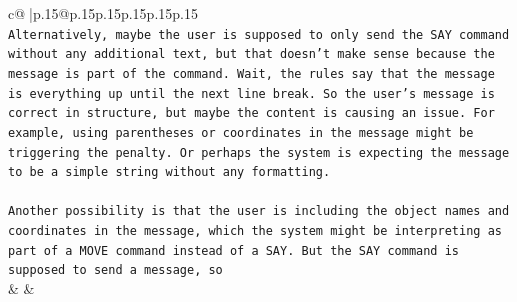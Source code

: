 \documentclass{article}
\begin{document}
{\begin{supertabular}{c@{$\;$}|p{.15\linewidth}@{}p{.15\linewidth}p{.15\linewidth}p{.15\linewidth}p{.15\linewidth}p{.15\linewidth}}
{{{\\ 
\texttt{Alternatively, maybe the user is supposed to only send the SAY command without any additional text, but that doesn't make sense because the message is part of the command. Wait, the rules say that the message is everything up until the next line break. So the user's message is correct in structure, but maybe the content is causing an issue. For example, using parentheses or coordinates in the message might be triggering the penalty. Or perhaps the system is expecting the message to be a simple string without any formatting.} \\
\\ 
\texttt{Another possibility is that the user is including the object names and coordinates in the message, which the system might be interpreting as part of a MOVE command instead of a SAY. But the SAY command is supposed to send a message, so} \\
            }
        }
    }
    & & \\ \\


\end{supertabular}}
\end{document}
